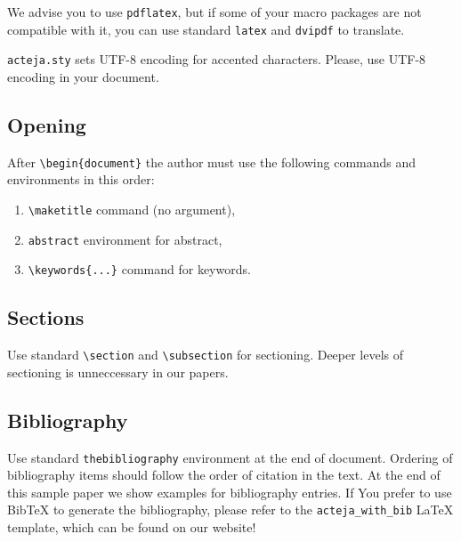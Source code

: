 \documentclass[10pt,a5paper]{article}
\begin{document}
We advise you to use \verb+pdflatex+, but if some of your macro packages are not
compatible with it, you can use standard \verb+latex+ and \verb+dvipdf+ to
translate.

\verb+acteja.sty+ sets UTF-8 encoding for accented characters. Please, use
UTF-8 encoding in your document.


\subsection{Opening}

After \verb+\begin{document}+ the author must use the following commands and
environments in this order:
\begin{enumerate}
 \item \verb+\maketitle+ command (no argument),
 \item \verb+abstract+ environment for abstract,
 \item \verb+\keywords{...}+ command for keywords.
\end{enumerate}


\subsection{Sections}

Use standard \verb+\section+ and \verb+\subsection+ for sectioning. Deeper
levels of sectioning is unneccessary in our papers.

\subsection{Bibliography}

Use standard \verb+thebibliography+ environment at the end of document. 
Ordering of bibliography items should follow the order of citation in the text.  
At the end of this sample paper we show examples for bibliography entries. 
If You prefer to use BibTeX to generate the bibliography,
please refer to the \verb+acteja_with_bib+ LaTeX template, which can be found
on our website!
\end{document}
